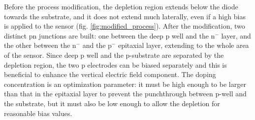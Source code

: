       Before the process modification, the depletion region extends below the diode towards the substrate, and it does not extend much laterally, even if a high bias is applied to the sensor (fig. \ref{fig:modified_process}). 
      After the modification, two distinct pn junctions are built: one between the deep p well and the n$^-$ layer, and the other between the n$^-$ and the p$^-$ epitaxial layer, extending to the whole area of the sensor.
      Since deep p well and the p-substrate are separated by the depletion region, the two p electrodes can be biased separately and this is beneficial to enhance the vertical electric field component.
      The doping concentration is an optimization parameter: it must be high enough to be larger than that in the epitaxial layer to prevent the punchthrough between p-well and the substrate, but it must also be low enough to allow the depletion for reasonable bias values.
